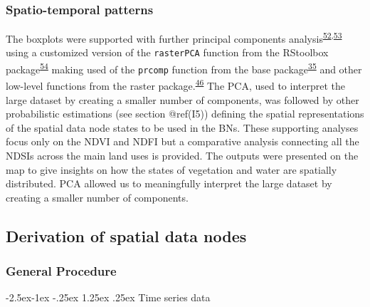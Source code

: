 \documentclass[12pt,oneside]{article}
\makeatletter
\renewcommand\paragraph{\@startsection{paragraph}{4}{\z@}%
            {-2.5ex\@plus -1ex \@minus -.25ex}%
            {1.25ex \@plus .25ex}%
            {\normalfont\normalsize\bfseries}}
\makeatother
\begin{document}
\hypertarget{I42}{%
\subsubsection{Spatio-temporal patterns}\label{I42}}

The boxplots were supported with further principal components analysis\textsuperscript{\protect\hyperlink{ref-Mardia_et_al_1979}{52},\protect\hyperlink{ref-Pearson_1901}{53}} using a customized version of the \texttt{rasterPCA} function from the RStoolbox package\textsuperscript{\protect\hyperlink{ref-Leutner_et_al_2019}{54}} making used of the \texttt{prcomp} function from the base package\textsuperscript{\protect\hyperlink{ref-RCoreTeam_2018}{35}} and other low-level functions from the raster package.\textsuperscript{\protect\hyperlink{ref-Hijmans_2019}{46}} The PCA, used to interpret the large dataset by creating a smaller number of components, was followed by other probabilistic estimations (see section @ref(I5)) defining the spatial representations of the spatial data node states to be used in the BNs. These supporting analyses focus only on the NDVI and NDFI but a comparative analysis connecting all the NDSIs across the main land uses is provided. The outputs were presented on the map to give insights on how the states of vegetation and water are spatially distributed. PCA allowed us to meaningfully interpret the large dataset by creating a smaller number of components.

\hypertarget{I5}{%
\subsection{Derivation of spatial data nodes}\label{I5}}

\hypertarget{I51}{%
\subsubsection{General Procedure}\label{I51}}

\hypertarget{I511}{%
\paragraph{Time series data}\label{I511}}
\end{document}
